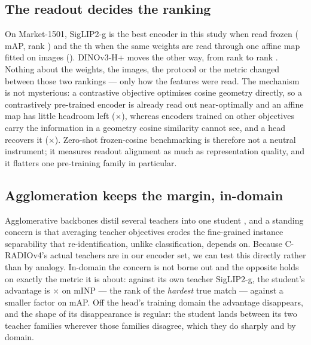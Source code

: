 \subsection*{The readout decides the ranking}
On Market-1501, SigLIP2-g is the best encoder in this study when read frozen
(\mapSiglipgFrozen{} mAP, rank \rankSiglipgFrozen{}) and the \rankSiglipgProbed{}th when the
same weights are read through one affine map fitted on \nHeadImages{} images
(\mapSiglipgProbed{}). DINOv3-H+ moves the other way, from rank \rankDinohpFrozen{} to rank
\rankDinohpProbed{}. Nothing about the weights, the images, the protocol or the metric changed
between those two rankings --- only how the features were read. The mechanism is not
mysterious: a contrastive objective optimises cosine geometry directly, so a
contrastively pre-trained encoder is already read out near-optimally and an affine map has
little headroom left (\gainSiglipg{}$\times$), whereas encoders trained on other objectives
carry the information in a geometry cosine similarity cannot see, and a head recovers it
(\gainDinohp{}$\times$). Zero-shot frozen-cosine benchmarking is therefore not a neutral
instrument; it measures readout alignment as much as representation quality, and it flatters
one pre-training family in particular.

\subsection*{Agglomeration keeps the margin, in-domain}
Agglomerative backbones distil several teachers into one student
\cite{ranzinger2024amradio,heinrich2025radiov25}, and a standing concern is that averaging
teacher objectives erodes the fine-grained instance separability that re-identification, unlike
classification, depends on. Because C-RADIOv4's actual teachers are in our encoder set, we can
test this directly rather than by analogy. In-domain the concern is not borne out and the
opposite holds on exactly the metric it is about: against its own teacher SigLIP2-g, the
student's advantage is \minpGap{}$\times$ on mINP --- the rank of the \emph{hardest} true match
--- against a smaller factor on mAP. Off the head's training domain the advantage disappears,
and the shape of its disappearance is regular: the student lands between its two teacher
families wherever those families disagree, which they do sharply and by domain.

